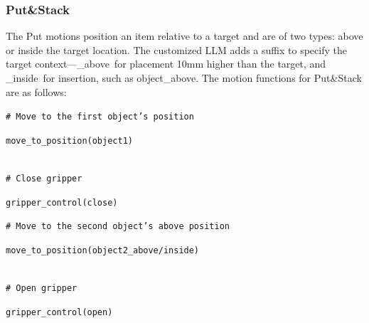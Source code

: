 \documentclass[letterpaper,conference]{ieeeconf}
\begin{document}
\subsubsection{Put\&Stack}
The Put motions position an item relative to a target and are of two types: above or inside the target location. The customized LLM adds a suffix to specify the target context—\textquotesingle \_above\textquotesingle\ for placement 10mm higher than the target, and \textquotesingle \_inside\textquotesingle\ for insertion, such as \textquotesingle object\_above\textquotesingle.
The motion functions for Put\&Stack are as follows:
\begin{codebox}
\textcolor{codegreen}{\footnotesize \texttt{\# Move to the first object's position}}\\
\colorbox{codeblue}{%
    \begin{minipage}{\dimexpr\textwidth-6pt\relax}
        \footnotesize \texttt{move\_to\_position(object1)}
    \end{minipage}%
}\\
\textcolor{codegreen}{\footnotesize \texttt{\# Close gripper}}\\
\colorbox{codeblue}{%
    \begin{minipage}{\dimexpr\textwidth-6pt\relax}
        \footnotesize \texttt{gripper\_control(close)}
    \end{minipage}%
}
\textcolor{codegreen}{\footnotesize \texttt{\# Move to the second object's above position}}\\
\colorbox{codeblue}{%
    \begin{minipage}{\dimexpr\textwidth-6pt\relax}
        \footnotesize \texttt{move\_to\_position(object2\_above/inside)}
    \end{minipage}%
}\\
\textcolor{codegreen}{\footnotesize \texttt{\# Open gripper}}\\
\colorbox{codeblue}{%
    \begin{minipage}{\dimexpr\textwidth-6pt\relax}
        \footnotesize \texttt{gripper\_control(open)}
    \end{minipage}%
}
\end{codebox}
\vspace{-1.5mm}
\end{document}
